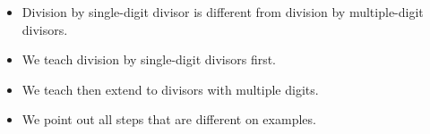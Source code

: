 \begin{frame}
\begin{itemize}
\item Division by single-digit divisor is different from division by multiple-digit divisors.
\item We teach division by single-digit divisors first.
\item We teach then extend to divisors with multiple digits. 
\item We point out all steps that are different on examples.
\end{itemize}
\end{frame}